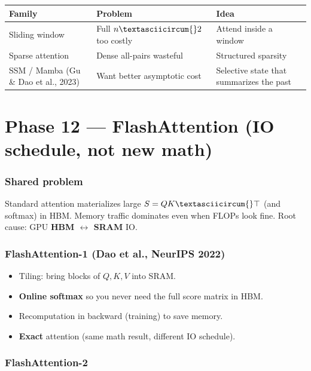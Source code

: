 \documentclass[11pt,a4paper]{article}
\begin{document}
\begin{table}[ht]
\centering\small
\begin{tabularx}{\textwidth}{@{}YYY@{}}
\toprule
\textbf{Family} & \textbf{Problem} & \textbf{Idea} \\
\midrule
Sliding window & Full \(n\textasciicircum{}2\) too costly & Attend inside a window \\
Sparse attention & Dense all-pairs wasteful & Structured sparsity \\
SSM / Mamba (Gu \& Dao et al., 2023) & Want better asymptotic cost & Selective state that summarizes the past \\
\bottomrule
\end{tabularx}
\end{table}


\bigskip


\clearpage
\section{Phase 12 --- FlashAttention (IO schedule, not new math)}


\subsubsection{Shared problem}

Standard attention materializes large \(S=QK\textasciicircum{}\top\) (and softmax) in HBM. Memory traffic dominates even when FLOPs look fine. Root cause: GPU \textbf{HBM $\leftrightarrow$ SRAM} IO.


\subsubsection{FlashAttention-1 (Dao et al., NeurIPS 2022)}

\begin{itemize}
\item Tiling: bring blocks of \(Q,K,V\) into SRAM.  
\item \textbf{Online softmax} so you never need the full score matrix in HBM.  
\item Recomputation in backward (training) to save memory.  
\item \textbf{Exact} attention (same math result, different IO schedule).
\end{itemize}


\subsubsection{FlashAttention-2}
\end{document}
